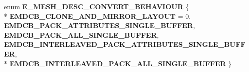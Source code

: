 \begin{DoxyCompactItemize}
\item 
enum {\bfseries E\+\_\+\+M\+E\+S\+H\+\_\+\+D\+E\+S\+C\+\_\+\+C\+O\+N\+V\+E\+R\+T\+\_\+\+B\+E\+H\+A\+V\+I\+O\+UR} \{ \\*
{\bfseries E\+M\+D\+C\+B\+\_\+\+C\+L\+O\+N\+E\+\_\+\+A\+N\+D\+\_\+\+M\+I\+R\+R\+O\+R\+\_\+\+L\+A\+Y\+O\+UT} = 0, 
{\bfseries E\+M\+D\+C\+B\+\_\+\+P\+A\+C\+K\+\_\+\+A\+T\+T\+R\+I\+B\+U\+T\+E\+S\+\_\+\+S\+I\+N\+G\+L\+E\+\_\+\+B\+U\+F\+F\+ER}, 
{\bfseries E\+M\+D\+C\+B\+\_\+\+P\+A\+C\+K\+\_\+\+A\+L\+L\+\_\+\+S\+I\+N\+G\+L\+E\+\_\+\+B\+U\+F\+F\+ER}, 
{\bfseries E\+M\+D\+C\+B\+\_\+\+I\+N\+T\+E\+R\+L\+E\+A\+V\+E\+D\+\_\+\+P\+A\+C\+K\+\_\+\+A\+T\+T\+R\+I\+B\+U\+T\+E\+S\+\_\+\+S\+I\+N\+G\+L\+E\+\_\+\+B\+U\+F\+F\+ER}, 
\\*
{\bfseries E\+M\+D\+C\+B\+\_\+\+I\+N\+T\+E\+R\+L\+E\+A\+V\+E\+D\+\_\+\+P\+A\+C\+K\+\_\+\+A\+L\+L\+\_\+\+S\+I\+N\+G\+L\+E\+\_\+\+B\+U\+F\+F\+ER}
 \}\hypertarget{namespaceirr_1_1video_a3486673ee24392647576d0a75d9f2e5b}{}\label{namespaceirr_1_1video_a3486673ee24392647576d0a75d9f2e5b}


\end{DoxyCompactItemize}
